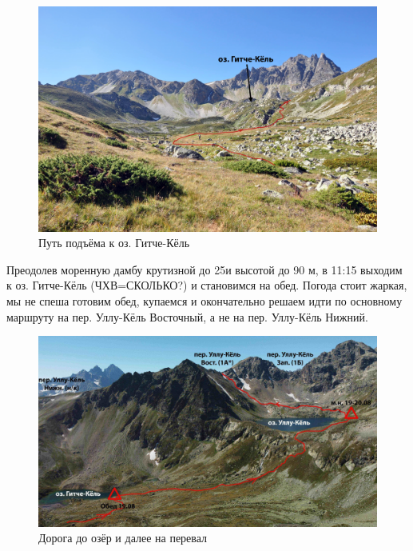 \begin{figure}[h!]
	\centering
	\includegraphics[width=0.7\linewidth]{../pics/DSC_0718}
	\caption{Путь подъёма к оз. Гитче-Кёль}
	\label{fig:DSC_0718}
\end{figure}

Преодолев моренную дамбу крутизной до 25\degree и высотой до 90 м, в 11:15 выходим к оз. Гитче-Кёль (ЧХВ=\alert{СКОЛЬКО?}) и становимся на обед. 
Погода стоит жаркая, мы не спеша готовим обед, купаемся и окончательно решаем идти по основному маршруту на пер. Уллу-Кёль Восточный, а не на пер. Уллу-Кёль Нижний.



\begin{figure}[h!]
	\centering
	\includegraphics[width=0.7\linewidth]{../pics/ullu_kuel_route}
	\caption{Дорога до озёр и далее на перевал}
	\label{fig:ullu_kuel_route}
\end{figure}

